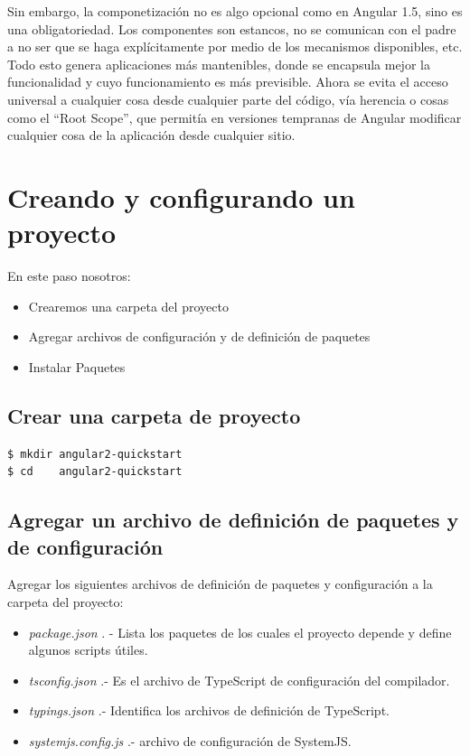 \documentclass[12pt,twoside]{book}
\begin{document}
Sin embargo, la componetización no es algo opcional como en Angular 1.5, sino es una obligatoriedad. Los componentes son estancos, no se comunican con el padre a no ser que se haga explícitamente por medio de los mecanismos disponibles, etc. Todo esto genera aplicaciones más mantenibles, donde se encapsula mejor la funcionalidad y cuyo funcionamiento es más previsible. Ahora se evita el acceso universal a cualquier cosa desde cualquier parte del código, vía herencia o cosas como el ``Root Scope'', que permitía en versiones tempranas de Angular modificar cualquier cosa de la aplicación desde cualquier sitio.

\section{Creando y configurando un proyecto}

En este paso nosotros:

\begin{itemize}
\item Crearemos una carpeta del proyecto
\item Agregar archivos de configuración y de definición de paquetes
\item Instalar Paquetes
\end{itemize}

\subsection{Crear una carpeta de proyecto}

\begin{lstlisting}[language=bash]
$ mkdir angular2-quickstart
$ cd    angular2-quickstart
\end{lstlisting}

\subsection{Agregar un archivo de definición de paquetes y de configuración}

Agregar los siguientes archivos de definición de paquetes y configuración a la carpeta del proyecto:

\begin{itemize}
\item \emph{package.json} . - Lista los paquetes de los cuales el proyecto depende y define algunos scripts útiles.
\item \emph{tsconfig.json}  .- Es el archivo de TypeScript de configuración del compilador.
\item \emph{typings.json} .- Identifica los archivos de definición de TypeScript.
\item \emph{systemjs.config.js} .- archivo de configuración de SystemJS.
\end{itemize}
\end{document}
